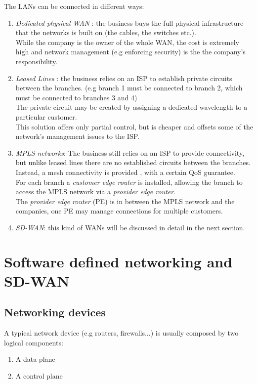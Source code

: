The LANs can be connected in different ways:
 

\begin{enumerate}
	\item \textit{Dedicated physical WAN} : the business buys the full physical infrastructure that the networks is built on (the cables, the switches etc.). \\ While the company is the owner of the whole WAN, the cost is extremely high and network management (e.g enforcing security) is the the company's responsibility.
	
	\item \textit{Leased Lines} : the business relies on an ISP to establish private circuits between the branches. (e.g branch 1 must be connected to branch 2, which must be connected to branches 3 and 4) \\
	The private circuit may be created by assigning  a dedicated wavelength to a particular customer. \\
	This solution offers only partial control, but is cheaper and offsets some of the network's management issues to the ISP.
	
	\item \textit{MPLS networks}: The business still relies on an ISP to provide connectivity, but unlike leased lines there are no established circuits between the branches.  Instead, a mesh connectivity is provided , with a certain QoS guarantee. \\
	For each branch a \textit{customer edge router} is installed, allowing the branch to access the MPLS network via a \textit{provider edge router}. \\
	The \textit{provider edge router} (PE) is in between the MPLS network and the companies, one PE may manage connections for multiple customers.
	
	\item \textit{SD-WAN}: this kind of WANs will be discussed in detail in the next section.
	
\end{enumerate}

\vspace{0.2cm}

\section{Software defined networking and SD-WAN}

\subsection{Networking devices}
A typical network device (e.g routers, firewalls...) is usually composed by two logical components:
\begin{enumerate}
	\item A data plane 
	\item A control plane
\end{enumerate}

